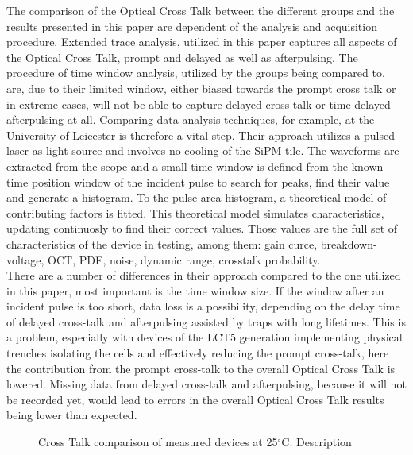\documentclass[12pt,article,type=msc,colorback,accentcolor=tud9c]{tudthesis}
\begin{document}
The comparison of the Optical Cross Talk between the different groups and the results presented in this paper are dependent of the analysis and acquisition procedure. Extended trace analysis, utilized in this paper captures all aspects of the Optical Cross Talk, prompt and delayed as well as afterpulsing. The procedure of time window analysis, utilized by the groups being compared to, are, due to their limited window, either biased towards the prompt cross talk or in extreme cases, will not be able to capture delayed cross talk or time-delayed afterpulsing at all. Comparing data analysis techniques, for example, at the University of Leicester is therefore a vital step. Their approach utilizes a pulsed laser as light source and involves no cooling of the SiPM tile. The waveforms are extracted from the scope and a small time window is defined from the known time position window of the incident pulse to search for peaks, find their value and generate a histogram. To the pulse area histogram, a theoretical model of contributing factors is fitted. This theoretical model simulates characteristics, updating continuosly to find their correct values. Those values are the full set of characteristics of the device in testing, among them: gain curce, breakdown-voltage, OCT, PDE, noise, dynamic range, crosstalk probability.\\
There are a number of differences in their approach compared to the one utilized in this paper, most important is the time window size. If the window after an incident pulse is too short, data loss is a possibility, depending on the delay time of delayed cross-talk and afterpulsing assisted by traps with long lifetimes. This is a problem, especially with devices of the LCT5 generation implementing physical trenches isolating the cells and effectively reducing the prompt cross-talk, here the contribution from the prompt cross-talk to the overall Optical Cross Talk is lowered. Missing data from delayed cross-talk and afterpulsing, because it will not be recorded yet, would lead to errors in the overall Optical Cross Talk results being lower than expected.\\


\begin{figure}[h]
\begin{centering}
\caption{Cross Talk comparison of measured devices at 25$^\circ$C. Description}
\label{fig:DC_OCT}
\end{centering}
\end{figure}
\end{document}
